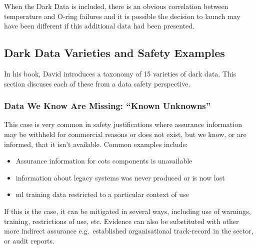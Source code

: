When the Dark Data is included, there is an obvious correlation between temperature and O-ring failures and it is possible the decision to launch may have been different if this additional data had been presented.

\subsection{Dark Data Varieties and Safety Examples}
In his book, David introduces a taxonomy of 15 varieties of dark data. This section discuses each of these from a data safety perspective.

\subsubsection{Data We Know Are Missing: ``Known Unknowns''}\label{bkm:dark1}

This case is very common in safety justifications where assurance \gls{information} may be withheld for commercial reasons or does not exist, but we know, or are informed, that it isn’t available. Common examples include:
\begin{itemize}
  \item Assurance \gls{information} for \gls{cots} components is unavailable
  \item \Gls{information} about legacy systems was never produced or is now lost
  \item \Gls{ml} training data restricted to a particular context of use
\end{itemize}
    If this is the case, it can be mitigated in several ways, including use of warnings, training, restrictions of use, etc. Evidence can also be substituted with other more indirect assurance e.g.\ established organisational track-record in the sector, or audit reports.
    
